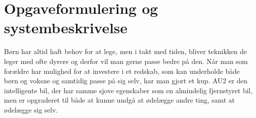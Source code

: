 \chapter{Opgaveformulering og systembeskrivelse} \label{ch:Systembeskrivelse} %

Børn har altid haft behov for at lege, men i takt med tiden, bliver teknikken de leger med ofte dyrere og derfor vil man gerne passe bedre på den. Når man som forældre har mulighed for at investere i et redskab, som kan underholde både børn og voksne og samtidig passe på sig selv, har man gjort et kup. AU2 er den intelligente bil, der har samme sjove egenskaber som en almindelig fjernstyret bil, men er opgraderet til både at kunne undgå at ødelægge andre ting, samt at ødelægge sig selv. 

